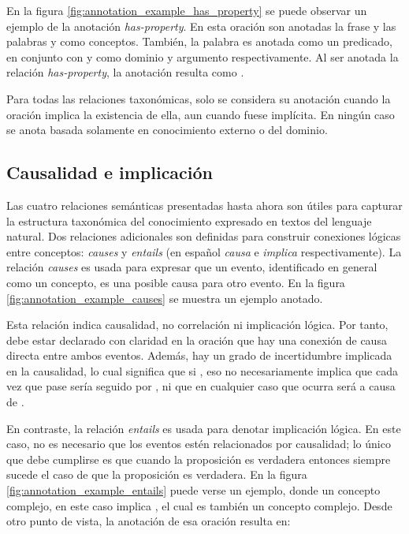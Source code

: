 En la figura \ref{fig:annotation_example_has_property} se puede observar un ejemplo de la anotación \textit{has-property}. En esta oración son anotadas la frase  y las palabras  y  como conceptos. También, la palabra  es anotada como un predicado, en conjunto con  y  como dominio y argumento respectivamente. Al ser anotada la relación \textit{has-property}, la anotación resulta como .

Para todas las relaciones taxonómicas, solo se considera su anotación cuando la oración implica la existencia de ella, aun cuando fuese implícita. En ningún caso se anota basada solamente en conocimiento externo o del dominio.

\vspace{-0.2in}
\subsection{Causalidad e implicación}
Las cuatro relaciones semánticas presentadas hasta ahora son útiles para capturar la estructura taxonómica del conocimiento expresado en textos del lenguaje natural. Dos relaciones adicionales son definidas para construir conexiones lógicas entre conceptos: \textit{causes} y \textit{entails} (en español \textit{causa} e \textit{implica} respectivamente). La relación \textit{causes} es usada para expresar que un evento, identificado en general como un concepto, es una posible causa para otro evento. En la figura \ref{fig:annotation_example_causes} se muestra un ejemplo anotado.

Esta relación indica causalidad, no correlación ni implicación lógica. Por tanto, debe estar declarado con claridad en la oración que hay una conexión de causa directa entre ambos eventos. Además, hay un grado de incertidumbre implicada en la causalidad, lo cual significa que si , eso no necesariamente implica que cada vez que pase  sería seguido por , ni que en cualquier caso que ocurra  será a causa de .

En contraste, la relación \textit{entails} es usada para denotar implicación lógica. En este caso, no es necesario que los eventos estén relacionados por causalidad; lo único que debe cumplirse es que cuando la proposición  es verdadera entonces siempre sucede el caso de que la proposición  es verdadera. En la figura \ref{fig:annotation_example_entails} puede verse un ejemplo, donde un concepto complejo, en este caso  implica , el cual es también un concepto complejo. Desde otro punto de vista, la anotación de esa oración resulta en:

